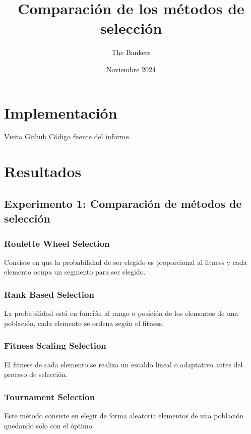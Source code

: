 \documentclass[12pt]{article}
\begin{document}
    \title{Comparación de los métodos de selección}
    \author{The Bankers}
    \date{Noviembre 2024}
    \maketitle
	\section{Implementación}
		Visita \href{https://www.overleaf.com}{Github} Código fuente del informe.
	
	\section{Resultados}
		\subsection[Experimento 1]{Experimento 1: Comparación de métodos de selección}
			\subsubsection[Roulette Wheel Selection]{Roulette Wheel Selection}
				Consiste en que la probabilidad de ser elegido es proporcional al fitness y cada elemento ocupa un segmento para ser elegido.
			
			\subsubsection[Rank Based Selection]{Rank Based Selection}
				La probabilidad está en función al rango o posición de los elementos de una población, cada elemento se ordena según el fitness.
			
			\subsubsection[Fitness Scaling Selection]{Fitness Scaling Selection}
				El fitness de cada elemento se realiza un escaldo lineal o adaptativo antes del proceso de selección.

			\subsubsection[Tournament Selection]{Tournament Selection}
				Este método consiste en elegir de forma aleatoria elementos de una población quedando solo con el óptimo.
\end{document}
